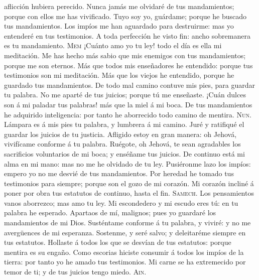 aflicción hubiera perecido.  Nunca jamás me olvidaré de
tus mandamientos; porque con ellos me has vivificado. 
Tuyo soy yo, guárdame; porque he buscado tus mandamientos.
 Los impíos me han aguardado para destruirme: mas yo
entenderé en tus testimonios.  A toda perfección he visto
fin: ancho sobremanera es tu mandamiento.  \textsc{Mem}
¡Cuánto amo yo tu ley! todo el día es ella mi meditación.
 Me has hecho más sabio que mis enemigos con tus
mandamientos; porque me son eternos.  Más que todos mis
enseñadores he entendido: porque tus testimonios son mi meditación.
 Más que los viejos he entendido, porque he guardado tus
mandamientos.  De todo mal camino contuve mis pies, para
guardar tu palabra.  No me aparté de tus juicios; porque
tú me enseñaste.  ¡Cuán dulces son á mi paladar tus
palabras! más que la miel á mi boca.  De tus
mandamientos he adquirido inteligencia: por tanto he aborrecido todo
camino de mentira.  \textsc{Nun}. Lámpara es á mis pies
tu palabra, y lumbrera á mi camino.  Juré y ratifiqué el
guardar los juicios de tu justicia.  Afligido estoy en
gran manera: oh Jehová, vivifícame conforme á tu palabra.
 Ruégote, oh Jehová, te sean agradables los sacrificios
voluntarios de mi boca; y enséñame tus juicios.  De
continuo está mi alma en mi mano: mas no me he olvidado de tu ley.
 Pusiéronme lazo los impíos: empero yo no me desvié de
tus mandamientos.  Por heredad he tomado tus testimonios
para siempre; porque son el gozo de mi corazón.  Mi
corazón incliné á poner por obra tus estatutos de continuo, hasta el
fin.  \textsc{Samech}. Los pensamientos vanos aborrezco;
mas amo tu ley.  Mi escondedero y mi escudo eres tú: en
tu palabra he esperado.  Apartaos de mí, malignos; pues
yo guardaré los mandamientos de mi Dios.  Susténtame
conforme á tu palabra, y viviré: y no me avergüences de mi esperanza.
 Sostenme, y seré salvo; y deleitaréme siempre en tus
estatutos.  Hollaste á todos los que se desvían de tus
estatutos: porque mentira es su engaño.  Como escorias
hiciste consumir á todos los impíos de la tierra: por tanto yo he amado
tus testimonios.  Mi carne se ha extremecido por temor
de ti; y de tus juicios tengo miedo.  \textsc{Ain}.
